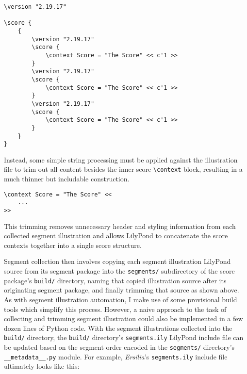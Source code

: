 \begin{singlespacing}
\vspace{-0.5\baselineskip}
\begin{verbatim}
\version "2.19.17"

\score {
    {
        \version "2.19.17"
        \score {
            \context Score = "The Score" << c'1 >>
        }
        \version "2.19.17"
        \score {
            \context Score = "The Score" << c'1 >>
        }
        \version "2.19.17"
        \score {
            \context Score = "The Score" << c'1 >>
        }
    }
}
\end{verbatim}
\end{singlespacing}

\noindent Instead, some simple string processing must be applied against the
illustration file to trim out all content besides the inner score
\texttt{\textbackslash{}context} block, resulting in a much thinner but
includable construction.

\begin{singlespacing}
\vspace{-0.5\baselineskip}
\begin{verbatim}
\context Score = "The Score" <<
    ...
>>
\end{verbatim}
\end{singlespacing}

\noindent This trimming removes unnecessary header and styling information from
each collected segment illustration and allows LilyPond to concatenate the
score contexts together into a single score structure.

Segment collection then involves copying each segment illustration LilyPond
source from its segment package into the \texttt{segments/} subdirectory of the
score package's \texttt{build/} directory, naming that copied illustration
source after its originating segment package, and finally trimming that source
as shown above. As with segment illustration automation, I make use of some
provisional build tools which simplify this process. However, a naive approach
to the task of collecting and trimming segment illustration could also be
implemented in a few dozen lines of Python code. With the segment illustrations
collected into the \texttt{build/} directory, the \texttt{build/} directory's
\texttt{segments.ily} LilyPond include file can be updated based on the segment
order encoded in the \texttt{segments/} directory's
\texttt{\_\_metadata\_\_.py} module. For example, \emph{Ersilia}'s
\texttt{segments.ily} include file ultimately looks like this:

